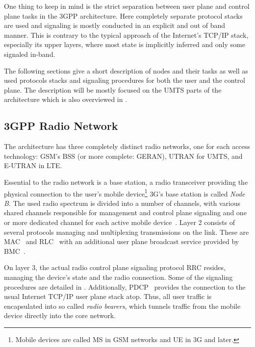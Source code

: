 One thing to keep in mind is the strict separation between user plane and control plane tasks in the \gls{3GPP} architecture. Here completely separate protocol stacks are used and signaling is mostly conducted in an explicit and out of band manner. This is contrary to the typical approach of the Internet's \gls{TCP}/\gls{IP} stack, especially its upper layers, where most state is implicitly inferred and only some signaled in-band. 

The following sections give a short description of nodes and their tasks as well as used protocols stacks and signaling procedures for both the user and the control plane. The description will be mostly focused on the \gls{UMTS} parts of the architecture which is also overviewed in \cite{3gpp.23.101}.


\subsection{\texorpdfstring{\acrshort{3GPP}}{3GPP} Radio Network}

The architecture has three completely distinct radio networks, one for each access technology: \gls{GSM}'s \gls{BSS} (or more complete: \gls{GERAN}), \gls{UTRAN} for \gls{UMTS}, and \gls{E-UTRAN} in \gls{LTE}.

Essential to the radio network is a base station, a radio transceiver providing the physical connection to the user's mobile device\footnote{Mobile devices are called \gls{MS} in \gls{GSM} networks and \gls{UE} in \gls{3G} and later.} \gls{3G}'s base station is called \textit{Node B}. The used radio spectrum is divided into a number of channels, with various shared channels responsible for management and control plane signaling and one or more dedicated channel for each active mobile device~\cite{3gpp.25.201,3gpp.25.301}. Layer 2 consists of several protocols managing and multiplexing transmissions on the link. These are \gls{MAC}~\cite{3gpp.25.321} and \gls{RLC}~\cite{3gpp.25.322} with an additional user plane broadcast service provided by \gls{BMC}~\cite{3gpp.25.324}. 

On layer 3, the actual radio control plane signaling protocol \gls{RRC} \cite{3gpp.25.331} resides, managing the device's state and the radio connection. Some of the signaling procedures are detailed in \cite{3gpp.25.931}. Additionally, \gls{PDCP}~\cite{3gpp.25.323} provides the connection to the  usual Internet \gls{TCP}/\gls{IP} user plane stack atop. Thus, all user traffic is encapsulated into so called \textit{radio bearers}, which tunnels traffic from the mobile device directly into the core network.

